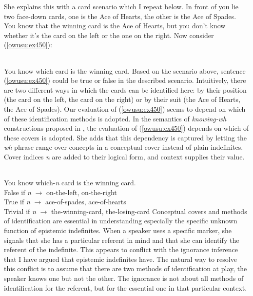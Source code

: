 \documentclass[output=paper,modfonts,nonflat,draftmode]{langsci/langscibook}
\begin{document}
She explains this with a card scenario which I repeat below.
 In front of you lie two face-down cards, one is the Ace of Hearts, the other is the Ace of Spades. You know that the winning card is the Ace of Hearts, but you don’t know whether it’s the card on the left or the one on the right. Now consider (\ref{owusu:ex450}):

\ea\label{owusu:ex450}\\
 You know which card is the winning card.
\z Based on the scenario above, sentence (\ref{owusu:ex450}) could be true or false in the described scenario. Intuitively, there are two different ways in which the cards can be identified here: by their position (the card on the left, the card on the right) or by their suit (the Ace of Hearts, the Ace of Spades). Our evaluation of (\ref{owusu:ex450}) seems to depend on which of these identification methods is adopted. In the semantics of \emph{knowing-wh} constructions proposed in \citet{Aloni2001}, the evaluation of (\ref{owusu:ex450}) depends on which of these covers is adopted. She adds that this dependency is captured by letting the \textit{wh}-phrase range over concepts in a conceptual cover instead of plain indefinites. Cover indices \emph{n} are added to their logical form, and context supplies their value. 


\ea\label{owusu:ex45}\\
 You know which-\emph{n} card is the winning card.\\
 False if   \emph{n} $\longrightarrow$ {on-the-left, on-the-right}\\
 True if    \emph{n} $\longrightarrow$ {ace-of-spades, ace-of-hearts} \\
 Trivial if \emph{n} $\longrightarrow$ {the-winning-card, the-losing-card}
\z 
Conceptual covers and methods of identification are essential in understanding especially the specific unknown function of epistemic indefinites. When a speaker uses a specific marker, she signals that she has a particular referent in mind and that she can identify the referent of the indefinite. This appears to conflict with the ignorance inference that I have argued that epistemic indefinites have. The natural way to resolve this conflict is to assume that there are two methods of identification at play, the speaker knows one but not the other. The ignorance is not about all methods of identification for the referent, but for the essential one in that particular context.  
\end{document}
